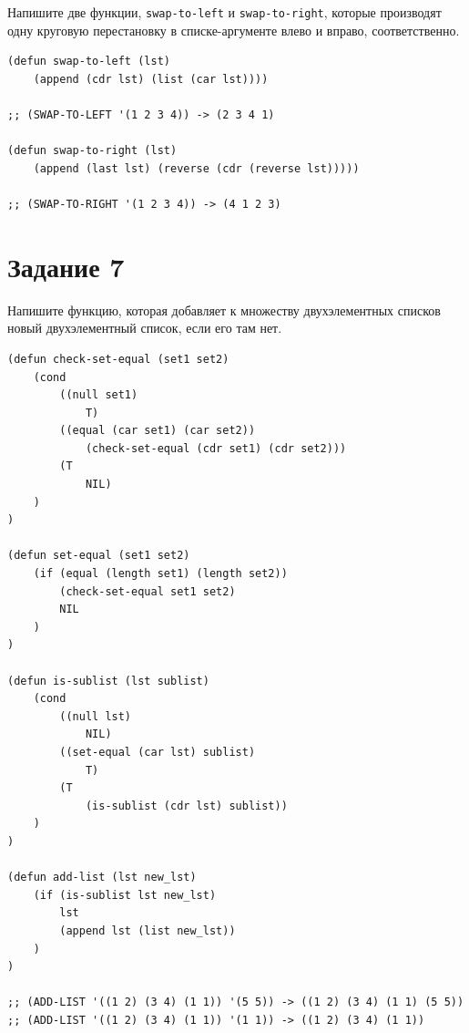\documentclass[a4paper,14pt, unknownkeysallowed]{extreport}
\begin{document}
Напишите две функции, \texttt{swap-to-left} и \texttt{swap-to-right}, которые производят одну круговую перестановку в списке-аргументе влево и вправо, соответственно.

\begin{center}
\captionsetup{justification=raggedright,singlelinecheck=off}
\begin{lstlisting}[label=lst:parallel_processing,caption=Решение задания 6]
(defun swap-to-left (lst)
    (append (cdr lst) (list (car lst))))

;; (SWAP-TO-LEFT '(1 2 3 4)) -> (2 3 4 1)

(defun swap-to-right (lst)
    (append (last lst) (reverse (cdr (reverse lst)))))

;; (SWAP-TO-RIGHT '(1 2 3 4)) -> (4 1 2 3)
\end{lstlisting}
\end{center}

\clearpage

\section{Задание 7}

Напишите функцию, которая добавляет к множеству двухэлементных списков новый двухэлементный список, если его там нет.

\begin{center}
\captionsetup{justification=raggedright,singlelinecheck=off}
\begin{lstlisting}[label=lst:parallel_processing,caption=Решение задания 7]
(defun check-set-equal (set1 set2)
    (cond 
        ((null set1)
            T)
        ((equal (car set1) (car set2)) 
            (check-set-equal (cdr set1) (cdr set2)))
        (T 
            NIL)
    )
)

(defun set-equal (set1 set2)
    (if (equal (length set1) (length set2))
        (check-set-equal set1 set2)
        NIL
    )
)

(defun is-sublist (lst sublist)
    (cond 
        ((null lst)
            NIL)
        ((set-equal (car lst) sublist) 
            T)
        (T 
            (is-sublist (cdr lst) sublist))
    )
)

(defun add-list (lst new_lst)
    (if (is-sublist lst new_lst)
        lst
        (append lst (list new_lst))
    )
)

;; (ADD-LIST '((1 2) (3 4) (1 1)) '(5 5)) -> ((1 2) (3 4) (1 1) (5 5))
;; (ADD-LIST '((1 2) (3 4) (1 1)) '(1 1)) -> ((1 2) (3 4) (1 1))
\end{lstlisting}
\end{center}
\end{document}
